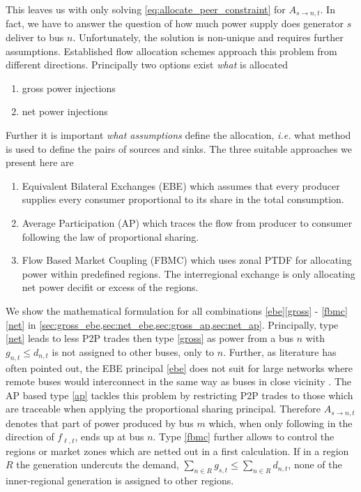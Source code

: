 \documentclass[11pt,twocolumn]{article}
\newcommand{\ie}{\textit{i.e.} }
\newcommand{\generation}{g_{s,t}}
\newcommand{\nodalgeneration}[1][n]{g_{#1,t}}
\newcommand{\demand}[1][n]{d_{#1,t}}
\newcommand{\nodaldemand}[1][n]{d_{#1,t}}
\newcommand{\flow}{f_{\ell,t}}
\newcommand{\allocatePeer}[1][s \rightarrow n]{A_{#1,t}}
\begin{document}
 
This leaves us with only solving \cref{eq:allocate_peer_constraint} for $\allocatePeer$. In fact, we have to answer the question of how much power supply does generator $s$ deliver to bus $n$. Unfortunately, the solution is non-unique and requires further assumptions. Established flow allocation schemes approach this problem from different directions. Principally two options exist \textit{what} is allocated 
% 
\begin{enumerate}
\item gross power injections \label{gross}
\item net power injections \label{net}
\end{enumerate}
% 
Further it is important \textit{what assumptions} define the allocation, \ie what method is used to define the pairs of sources and sinks. The three suitable approaches we present here are
% 
\begin{enumerate}[label=\alph*., ref=\alph*]
\item Equivalent Bilateral Exchanges (EBE) \cite{galiana_transmission_2003} which assumes
that every producer supplies every consumer proportional to its share in the total consumption. \label{ebe} 
\item Average Participation (AP) \cite{bialek_tracing_1996,achayuthakan_electricity_2010-1} which traces the flow from producer to consumer following the law of proportional sharing. \label{ap}
\item Flow Based Market Coupling (FBMC) which uses zonal PTDF for allocating power within predefined regions. The interregional exchange is only allocating net power decifit or excess of the regions. \label{fbmc}
\end{enumerate}
% 
We show the mathematical formulation for all combinations \ref{ebe}\ref{gross} - \ref{fbmc}\ref{net} in \cref{sec:gross_ebe,sec:net_ebe,sec:gross_ap,sec:net_ap}.
% 
Principally, type \ref{net} leads to less P2P trades then type \ref{gross} as power from a bus $n$ with $\nodalgeneration \le \nodaldemand$ is not assigned to other buses, only to $n$. 
Further, as literature has often pointed out, the EBE principal \ref{ebe} does not suit for large networks where remote buses would interconnect in the same way as buses in close vicinity \cite{gil_multiarea_2005}. The AP based type \ref{ap} tackles this problem by restricting P2P trades to those which are traceable when applying the proportional sharing principal. Therefore $\allocatePeer$ denotes that part of power produced by bus $m$ which, when only following in the direction of $\flow$, ends up at bus $n$. Type \ref{fbmc} further allows to control the regions or market zones which are netted out in a first calculation. If in a region $R$ the generation undercuts the demand, $\sum_{n \in R} \generation \le \sum_{n \in R} \demand$, none of the inner-regional generation is assigned to other regions. 
\end{document}
